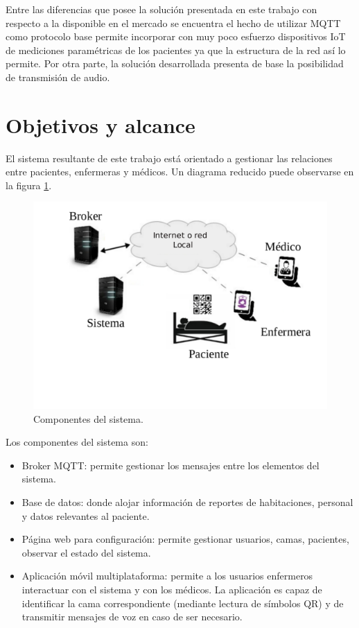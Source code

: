 Entre las diferencias que posee la solución presentada en este trabajo con respecto a la disponible en el mercado se encuentra el hecho de utilizar MQTT como protocolo base permite incorporar con muy poco esfuerzo dispositivos IoT de mediciones paramétricas de los pacientes ya que la estructura de la red así lo permite. Por otra parte, la solución desarrollada presenta de base la posibilidad de transmisión de audio. 



\section{Objetivos y alcance}

El sistema resultante de este trabajo está orientado a gestionar las relaciones entre pacientes, enfermeras y médicos. Un diagrama reducido puede observarse en la figura \ref{fig:Figura-reducida}.  

\begin{figure}[ht]
	\centering
	\includegraphics[scale=.45]{./Figures/diag-redux.pdf}
	\caption{Componentes del sistema.}
	\label{fig:Figura-reducida}
\end{figure}


Los componentes del sistema son:
\begin{itemize}
\item Broker MQTT: permite gestionar los mensajes entre los elementos del sistema.
\item Base de datos: donde alojar información de reportes de habitaciones, personal y datos relevantes al paciente.
\item Página web para configuración: permite gestionar usuarios, camas, pacientes, observar el estado del sistema.
\item Aplicación móvil multiplataforma: permite a los usuarios enfermeros interactuar con el sistema y con los médicos. La aplicación es capaz de identificar la cama correspondiente (mediante lectura de símbolos QR) y de transmitir mensajes de voz en caso de ser necesario.
\end{itemize}

